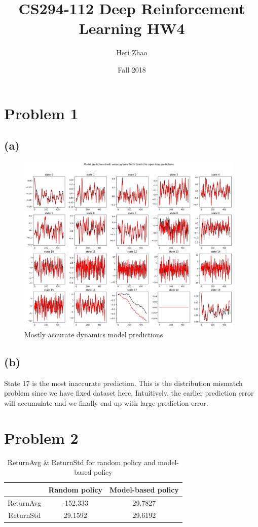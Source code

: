 \documentclass[12pt]{article}
\title{CS294-112 Deep Reinforcement Learning HW4}
\author{ Heri Zhao
}
\date{Fall 2018}
\begin{document}
\maketitle

\section*{Problem 1}

\subsection*{(a)}
\begin{figure}[H]
  \centering
  \includegraphics[height=3.4in]{prediction_001.jpg}
  \caption{Mostly accurate dynamics model predictions}
\end{figure}

\subsection*{(b)}
State 17 is the most inaccurate prediction. This is the distribution mismatch problem since we have fixed dataset here. Intuitively, the earlier prediction error will accumulate and we finally end up with large prediction error.

\newpage
\section*{Problem 2}
\begin{table}[H]
\begin{center}
  \begin{tabular}{ c | c | c }
    \hline
    & Random policy & Model-based policy \\ \hline
    ReturnAvg & -152.333 & 29.7827 \\ \hline
    ReturnStd & 29.1592 & 29.6192 \\ \hline
  \end{tabular}
  \caption{ReturnAvg \& ReturnStd for random policy and model-based policy}
\end{center}
\end{table}
\end{document}
